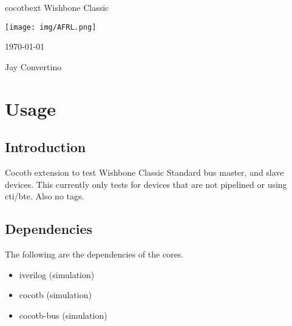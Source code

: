 \begin{titlepage}
  \begin{center}

  {\Huge cocotbext Wishbone Classic}

  \vspace{25mm}

  \texttt{[image: img/AFRL.png]}

  \vspace{25mm}

  \today

  \vspace{15mm}

  {\Large Jay Convertino}

  \end{center}
\end{titlepage}

\tableofcontents

\newpage

\section{Usage}

\subsection{Introduction}

\par
Cocotb extension to test Wishbone Classic Standard bus master, and slave devices.
This currently only tests for devices that are not pipelined or using cti/bte. Also no tags.

\subsection{Dependencies}

\par
The following are the dependencies of the cores.

\begin{itemize}
  \item iverilog (simulation)
  \item cocotb (simulation)
  \item cocotb-bus (simulation)
\end{itemize}

